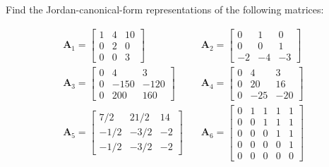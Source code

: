 \item Find the Jordan-canonical-form
representations of the following matrices:

\begin{align*}
 \mathbf{A}_1 = \begin{bmatrix}
        1 & 4 &10\\
        0 & 2 & 0\\
        0 & 0 & 3
       \end{bmatrix}
& \quad
\mathbf{A}_2 = \begin{bmatrix}
        0 & 1 & 0\\
        0 & 0 & 1\\
        -2 & -4 & -3
       \end{bmatrix}
\\
\mathbf{A}_3 = \begin{bmatrix}
        0 & 4 & 3\\
        0 & -150 & -120\\
        0 & 200 & 160
       \end{bmatrix}
& \quad
\mathbf{A}_4 = \begin{bmatrix}
        0 & 4 & 3\\
        0 & 20 & 16\\
        0 & -25 & -20
       \end{bmatrix}
\\
\mathbf{A}_5 = \begin{bmatrix}
        7/2 & 21/2 & 14\\
        -1/2 & -3/2 & -2\\
        -1/2 & -3/2 &-2
       \end{bmatrix}
& \quad
\mathbf{A}_6 = \begin{bmatrix}
        0 & 1 & 1 & 1 & 1\\
        0 & 0 & 1 & 1 & 1\\
        0 & 0 & 0 & 1 & 1\\
        0 & 0 & 0 & 0 & 1\\
        0 & 0 & 0 & 0 & 0
       \end{bmatrix}
\end{align*}


